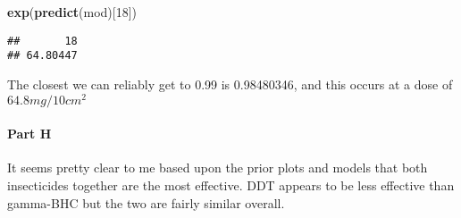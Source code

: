 \documentclass[
]{article}
\newenvironment{Shaded}{\begin{snugshade}}{\end{snugshade}}
\newcommand{\DecValTok}[1]{\textcolor[rgb]{0.00,0.00,0.81}{#1}}
\newcommand{\KeywordTok}[1]{\textcolor[rgb]{0.13,0.29,0.53}{\textbf{#1}}}
\newcommand{\NormalTok}[1]{#1}
\begin{document}
\begin{Shaded}
\begin{Highlighting}[]
\KeywordTok{exp}\NormalTok{(}\KeywordTok{predict}\NormalTok{(mod)[}\DecValTok{18}\NormalTok{])}
\end{Highlighting}
\end{Shaded}

\begin{verbatim}
##       18 
## 64.80447
\end{verbatim}

The closest we can reliably get to 0.99 is 0.98480346, and this occurs
at a dose of \(64.8 mg/10cm^2\)

\hypertarget{part-h}{%
\paragraph{Part H}\label{part-h}}

It seems pretty clear to me based upon the prior plots and models that
both insecticides together are the most effective. DDT appears to be
less effective than gamma-BHC but the two are fairly similar overall.
\end{document}
